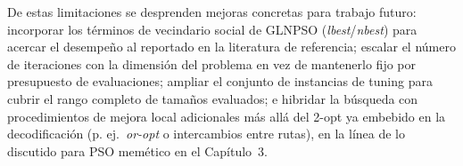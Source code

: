 De estas limitaciones se desprenden mejoras concretas para trabajo futuro: incorporar
los términos de vecindario social de GLNPSO (\textit{lbest}/\textit{nbest}) para acercar
el desempeño al reportado en la literatura de referencia; escalar el número de
iteraciones con la dimensión del problema en vez de mantenerlo fijo por presupuesto de
evaluaciones; ampliar el conjunto de instancias de tuning para cubrir el rango completo
de tamaños evaluados; e hibridar la búsqueda con procedimientos de mejora local
adicionales más allá del 2-opt ya embebido en la decodificación (p. ej.\ \textit{or-opt}
o intercambios entre rutas), en la línea de lo discutido para PSO memético en el
Capítulo~3.
